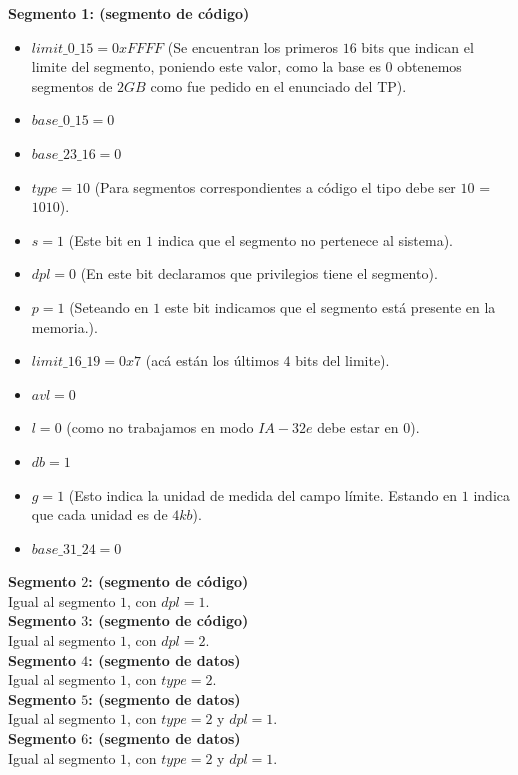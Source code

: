 \documentclass[a4paper,10pt,twoside]{article}
\begin{document}
\textbf{Segmento 1: (segmento de código)}
\begin{itemize}
 \item $limit\_0\_15 = 0xFFFF$ (Se encuentran los primeros $16$ bits que indican el limite del segmento, poniendo este valor, como la base es $0$ obtenemos segmentos de $2GB$ como fue pedido en el enunciado del TP).
 \item $base\_0\_15 = 0$ 
 \item $base\_23\_16 = 0$
 \item $type = 10$ (Para segmentos correspondientes a código el tipo debe ser $10$ = $1010$).
 \item $s = 1$ 	(Este bit en $1$ indica que el segmento no pertenece al sistema).
 \item $dpl = 0$ (En este bit declaramos que privilegios tiene el segmento).
 \item $p = 1$ (Seteando en $1$ este bit indicamos que el segmento está presente en la memoria.).
 \item $limit\_16\_19 = 0x7$ (acá están los últimos $4$ bits del limite).
 \item $avl = 0$
 \item $l = 0$ (como no trabajamos en modo $IA-32e$ debe estar en $0$).
 \item $db = 1$
 \item $g = 1$ (Esto indica la unidad de medida del campo límite. Estando en $1$ indica que cada unidad es de $4kb$).
 \item $base\_31\_24  = 0$
\end{itemize}

\textbf{Segmento $2$: (segmento de código)} \\
Igual al segmento $1$, con $dpl = 1$. \\

\textbf{Segmento $3$: (segmento de código)} \\
Igual al segmento $1$, con $dpl = 2$. \\

\textbf{Segmento $4$: (segmento de datos)} \\
Igual al segmento $1$, con $type = 2$. \\

\textbf{Segmento $5$: (segmento de datos)} \\
Igual al segmento $1$, con $type = 2$ y $dpl = 1$. \\

\textbf{Segmento $6$: (segmento de datos)} \\
Igual al segmento $1$, con $type = 2$ y $dpl = 1$. \\
\end{document}

